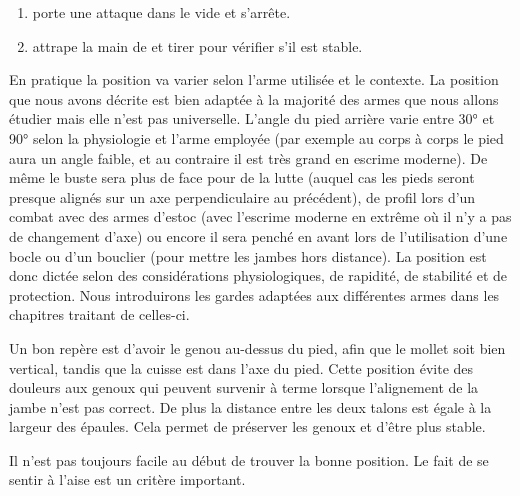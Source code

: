 \begin{exercice}
	\label{struc:ex:stabilité-frappe}


	\begin{enumerate}
		\item \A porte une attaque dans le vide et s'arrête.
		
		\item \D attrape la main de \A et tirer pour vérifier s'il est stable.
	\end{enumerate}
\end{exercice}


En pratique la position va varier selon l'arme utilisée et le contexte.
La position que nous avons décrite est bien adaptée à la majorité des armes que nous allons étudier mais elle n'est pas universelle.
L'angle du pied arrière varie entre \ang{30} et \ang{90} selon la physiologie et l'arme employée (par exemple au corps à corps le pied aura un angle faible, et au contraire il est très grand en escrime moderne).
De même le buste sera plus de face pour de la lutte (auquel cas les pieds seront presque alignés sur un axe perpendiculaire au précédent), de profil lors d'un combat avec des armes d'estoc (avec l'escrime moderne en extrême où il n'y a pas de changement d'axe) ou encore il sera penché en avant lors de l'utilisation d'une bocle ou d'un bouclier (pour mettre les jambes hors distance).
La position est donc dictée selon des considérations physiologiques, de rapidité, de stabilité et de protection.
Nous introduirons les gardes adaptées aux différentes armes dans les chapitres traitant de celles-ci.

Un bon repère est d'avoir le genou au-dessus du pied, afin que le mollet soit bien vertical, tandis que la cuisse est dans l'axe du pied.
Cette position évite des douleurs aux genoux qui peuvent survenir à terme lorsque l'alignement de la jambe n'est pas correct.
De plus la distance entre les deux talons est égale à la largeur des épaules.
Cela permet de préserver les genoux et d'être plus stable.

Il n'est pas toujours facile au début de trouver la bonne position.
Le fait de se sentir à l'aise est un critère important.


